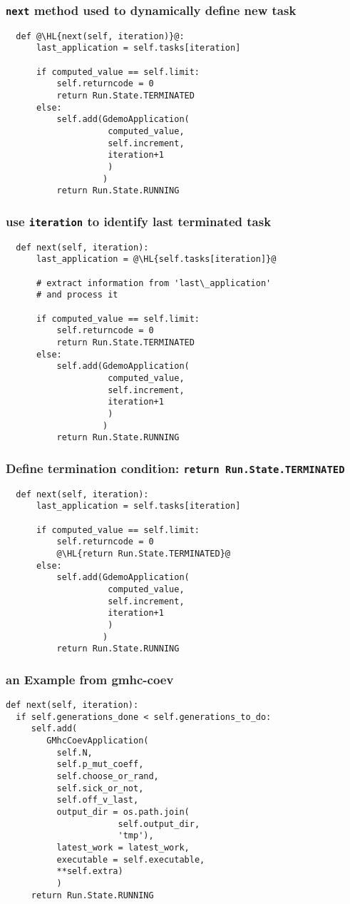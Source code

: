 \documentclass[english,serif,mathserif,xcolor=pdftex,dvipsnames,table]{beamer}
\begin{document}
\begin{frame}[fragile]
\frametitle{\texttt{next} method used to dynamically define new task}
  \begin{lstlisting}
  def @\HL{next(self, iteration)}@:
      last_application = self.tasks[iteration]

      if computed_value == self.limit:
          self.returncode = 0
          return Run.State.TERMINATED
      else:
          self.add(GdemoApplication(
                    computed_value,
                    self.increment,
                    iteration+1
                    )
                   )
          return Run.State.RUNNING
  \end{lstlisting}
\end{frame}

\begin{frame}[fragile]
\frametitle{use \texttt{iteration} to identify last terminated task}
  \begin{lstlisting}
  def next(self, iteration):
      last_application = @\HL{self.tasks[iteration]}@

      # extract information from 'last\_application'
      # and process it

      if computed_value == self.limit:
          self.returncode = 0
          return Run.State.TERMINATED
      else:
          self.add(GdemoApplication(
                    computed_value,
                    self.increment,
                    iteration+1
                    )
                   )
          return Run.State.RUNNING
  \end{lstlisting}
\end{frame}

\begin{frame}[fragile]
 \frametitle{Define termination condition: \texttt{return Run.State.TERMINATED}}
 \begin{lstlisting}
  def next(self, iteration):
      last_application = self.tasks[iteration]

      if computed_value == self.limit:
          self.returncode = 0
          @\HL{return Run.State.TERMINATED}@
      else:
          self.add(GdemoApplication(
                    computed_value,
                    self.increment,
                    iteration+1
                    )
                   )
          return Run.State.RUNNING
  \end{lstlisting}
\end{frame}

\begin{frame}[fragile]
  \frametitle{an Example from gmhc-coev}
 \begin{lstlisting}
def next(self, iteration):
  if self.generations_done < self.generations_to_do:
     self.add(
        GMhcCoevApplication(
          self.N,
          self.p_mut_coeff,
          self.choose_or_rand,
          self.sick_or_not,
          self.off_v_last,
          output_dir = os.path.join(
                      self.output_dir,
                      'tmp'),
          latest_work = latest_work,
          executable = self.executable,
          **self.extra)
          )
     return Run.State.RUNNING
  \end{lstlisting}
\end{frame}
\end{document}

